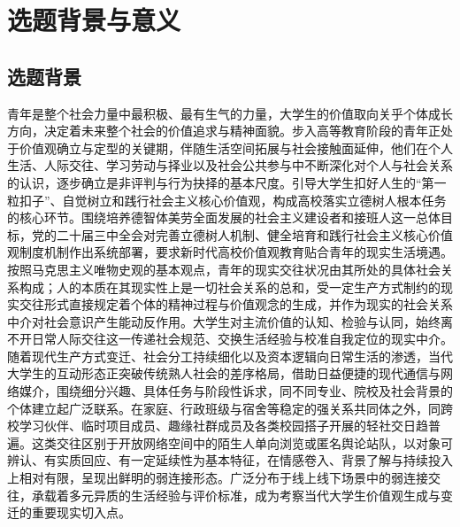 \section{选题背景与意义}

\subsection{选题背景}

青年是整个社会力量中最积极、最有生气的力量\cite{Mao1991}，大学生的价值取向关乎个体成长方向，决定着未来整个社会的价值追求与精神面貌\cite{Xi2014}。步入高等教育阶段的青年正处于价值观确立与定型的关键期，伴随生活空间拓展与社会接触面延伸，他们在个人生活、人际交往、学习劳动与择业以及社会公共参与中不断深化对个人与社会关系的认识，逐步确立是非评判与行为抉择的基本尺度\cite{CPCC2017_Plan}。引导大学生扣好人生的“第一粒扣子”、自觉树立和践行社会主义核心价值观，构成高校落实立德树人根本任务的核心环节\cite{CPCC2017_Ipe}。围绕培养德智体美劳全面发展的社会主义建设者和接班人这一总体目标\cite{Xi2018_Speech}，党的二十届三中全会对完善立德树人机制、健全培育和践行社会主义核心价值观制度机制作出系统部署\cite{CPCC2024_Jueding}，要求新时代高校价值观教育贴合青年的现实生活境遇。按照马克思主义唯物史观的基本观点，青年的现实交往状况由其所处的具体社会关系构成；人的本质在其现实性上是一切社会关系的总和，受一定生产方式制约的现实交往形式直接规定着个体的精神过程与价值观念的生成，并作为现实的社会关系中介对社会意识产生能动反作用\cite{MarxEngels2009}。大学生对主流价值的认知、检验与认同，始终离不开日常人际交往这一传递社会规范、交换生活经验与校准自我定位的现实中介。随着现代生产方式变迁、社会分工持续细化以及资本逻辑向日常生活的渗透，当代大学生的互动形态正突破传统熟人社会的差序格局，借助日益便捷的现代通信与网络媒介，围绕细分兴趣、具体任务与阶段性诉求，同不同专业、院校及社会背景的个体建立起广泛联系。在家庭、行政班级与宿舍等稳定的强关系共同体之外，同跨校学习伙伴、临时项目成员、趣缘社群成员及各类校园搭子开展的轻社交日趋普遍。这类交往区别于开放网络空间中的陌生人单向浏览或匿名舆论站队，以对象可辨认、有实质回应、有一定延续性为基本特征，在情感卷入、背景了解与持续投入上相对有限，呈现出鲜明的弱连接形态。广泛分布于线上线下场景中的弱连接交往，承载着多元异质的生活经验与评价标准，成为考察当代大学生价值观生成与变迁的重要现实切入点。

